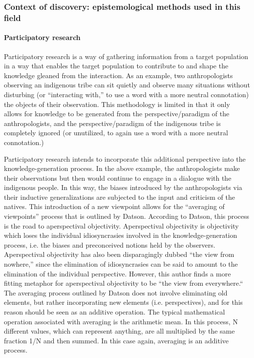 \documentclass[a4paper]{article}
\begin{document}
\subsubsection{Context of discovery: epistemological methods used in this field}

\paragraph{Participatory research}

Participatory research is a way of gathering information from a target
population in a way that enables the target population to contribute to and
shape the knowledge gleaned from the interaction. As an example, two
anthropologists observing an indigenous tribe can sit quietly and observe many
situations without disturbing (or ``interacting with,'' to use a word with a
more neutral connotation) the objects of their observation. This methodology
is limited in that it only allows for knowledge to be generated from the
perspective/paradigm of the anthropologists, and the perspective/paradigm of
the indigenous tribe is completely ignored (or unutilized, to again use a word
with a more neutral connotation.)

Participatory research intends to incorporate this additional perspective into
the knowledge-generation process. In the above example, the anthropologists
make their observations but then would continue to engage in a dialogue with
the indigenous people. In this way, the biases introduced by the
anthropologists via their inductive generalizations are subjected to the input
and criticism of the natives. This introduction of a new viewpoint allows for
the ``averaging of viewpoints'' process that is outlined by Datson. According
to Datson, this process is the road to aperspectival objectivity.
Aperspectival objectivity is objectivity which loses the individual
idiosyncrasies involved in the knowledge-generation process, i.e. the biases
and preconceived notions held by the observers. Aperspectival objectivity has
also been disparagingly dubbed ``the view from nowhere,'' since the
elimination of idiosyncrasies can be said to amount to the elimination of the
individual perspective. However, this author finds a more fitting metaphor for
aperspectival objectivity to be ``the view from everywhere.`` The averaging
process outlined by Datson does not involve eliminating old elements, but
rather incorporating new elements (i.e.  perspectives), and for this reason
should be seen as an additive operation.  The typical mathematical operation
associated with averaging is the arithmetic mean. In this process, N different
values, which can represent anything, are all multiplied by the same fraction
1/N and then summed. In this case again, averaging is an additive process.
\end{document}
